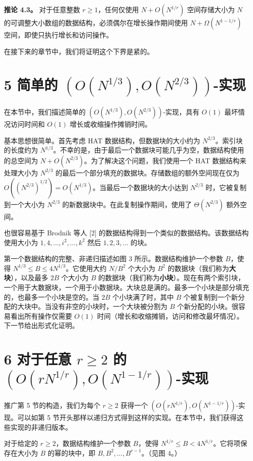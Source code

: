 \documentclass[12pt,a4paper]{ctexart}
\theoremstyle{remark}
\begin{document}
\textbf{推论 4.3。} 对于任意整数 $r\geq 1$，任何仅使用 $N+O(N^{1/r})$ 空间存储大小为 $N$ 的可调整大小数组的数据结构，必须偶尔在增长操作期间使用 $N+\Omega(N^{1-1/r})$ 空间，即使只执行增长和访问操作。

在接下来的章节中，我们将证明这个下界是紧的。

\section{5 简单的 $(O(N^{1/3}),O(N^{2/3}))$-实现}

在本节中，我们描述简单的 $(O(N^{1/3}),O(N^{2/3}))$-实现，具有 $O(1)$ 最坏情况访问时间和 $O(1)$ 增长或收缩操作摊销时间。

基本思想很简单。首先考虑 HAT 数据结构，但数据块的大小约为 $N^{2/3}$。索引块的长度约为 $N^{1/3}$。不幸的是，由于最后一个数据块可能几乎为空，数据结构使用的总空间为 $N+O(N^{2/3})$。为了解决这个问题，我们使用一个 HAT 数据结构来处理大小为 $N^{2/3}$ 的最后一个部分填充的数据块。存储数组的额外空间现在仅为 $O((N^{2/3})^{1/2})=O(N^{1/3})$。当最后一个数据块的大小达到 $N^{2/3}$ 时，它被复制到一个大小为 $N^{2/3}$ 的新数据块中。在此复制操作期间，使用了 $\Theta(N^{2/3})$ 额外空间。

也很容易基于 Brodnik 等人 [2] 的数据结构得到一个类似的数据结构。该数据结构使用大小为 $1,4,\ldots,i^2,\ldots,k^2$ 然后 $1,2,3,\ldots$ 的块。

第一个数据结构的完整、非递归描述如图 3 所示。数据结构维护一个参数 $B$，使得 $N^{1/3}\leq B\leq 4N^{1/3}$。它使用大约 $N/B^2$ 个大小为 $B^2$ 的数据块（我们称为\textbf{大块}），以及最多 $2B$ 个大小为 $B$ 的数据块（我们称为\textbf{小块}）。现在有两个索引块，一个用于大数据块，一个用于小数据块。大块总是满的。最多一个小块是部分填充的，也最多一个小块是空的。当 $2B$ 个小块满了时，其中 $B$ 个被复制到一个新分配的大块中。当没有非空的小块时，一个大块被分割为 $B$ 个新分配的小块。很容易看出所有操作仅需要 $O(1)$ 时间（增长和收缩摊销，访问和修改最坏情况）。下一节给出形式化证明。

\section{6 对于任意 $r\geq 2$ 的 $(O(rN^{1/r}),O(N^{1-1/r}))$-实现}

推广第 5 节的构造，我们为每个 $r\geq 2$ 获得一个 $(O(rN^{1/r}),O(N^{1-1/r}))$-实现。可以如第 5 节开头那样以递归方式得到这样的实现。在本节中，我们获得这些实现的非递归版本。

对于给定的 $r\geq 2$，数据结构维护一个参数 $B$，使得 $N^{1/r}\leq B<4N^{1/r}$。它将项保存在大小为 $B$ 的幂的块中，即 $B,B^2,\ldots,B^{r-1}$。（见图 4。）
\end{document}

